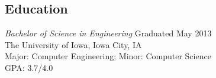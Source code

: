 \documentclass[line,margin]{res}
\begin{document}
\begin{resume}

		\section{Education}
            {\sl Bachelor of Science in Engineering} \hfill Graduated May 2013 \\
                The University of Iowa, Iowa City, IA \\
                Major: Computer Engineering; Minor: Computer Science \\ 
                GPA: 3.7/4.0    
            

\end{resume}
\end{document}
